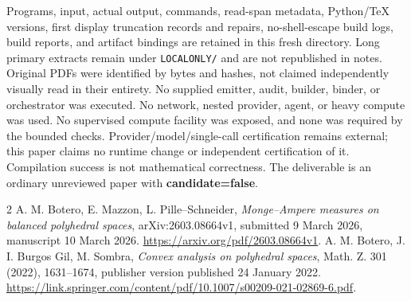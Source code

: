 \documentclass[11pt]{article}
\theoremstyle{definition}\newtheorem{definition}[theorem]{Definition}
\theoremstyle{remark}\newtheorem{remark}[theorem]{Remark}
\begin{document}
Programs, input, actual output, commands, read-span metadata, Python/TeX versions, first display truncation records and repairs, no-shell-escape build logs, build reports, and artifact bindings are retained in this fresh directory. Long primary extracts remain under \texttt{LOCALONLY/} and are not republished in notes. Original PDFs were identified by bytes and hashes, not claimed independently visually read in their entirety. No supplied emitter, audit, builder, binder, or orchestrator was executed. No network, nested provider, agent, or heavy compute was used. No supervised compute facility was exposed, and none was required by the bounded checks. Provider/model/single-call certification remains external; this paper claims no runtime change or independent certification of it. Compilation success is not mathematical correctness. The deliverable is an ordinary unreviewed paper with \textbf{candidate=false}.

\begin{thebibliography}{2}
 A. M. Botero, E. Mazzon, L. Pille--Schneider, \emph{Monge--Ampere measures on balanced polyhedral spaces}, arXiv:2603.08664v1, submitted 9 March 2026, manuscript 10 March 2026. \url{https://arxiv.org/pdf/2603.08664v1}.
 A. M. Botero, J. I. Burgos Gil, M. Sombra, \emph{Convex analysis on polyhedral spaces}, Math. Z. 301 (2022), 1631--1674, publisher version published 24 January 2022. \url{https://link.springer.com/content/pdf/10.1007/s00209-021-02869-6.pdf}.
\end{thebibliography}
\end{document}
